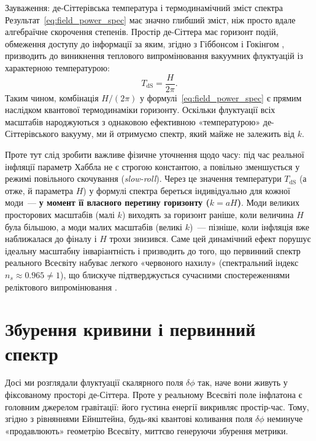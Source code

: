 \begin{keybox}{Зауваження: де-Сіттерівська температура і термодинамічний зміст спектра}
Результат~\eqref{eq:field_power_spec} має значно глибший зміст, ніж просто вдале
алгебраїчне скорочення степенів. Простір де-Сіттера має горизонт подій, обмеження доступу
до інформації за яким, згідно з Гіббонсом і Гокінгом \cite{gibbons_hawking_1977},
призводить до виникнення теплового випромінювання вакуумних флуктуацій із характерною
температурою:
\begin{equation*}
  T_\mathrm{dS} = \frac{H}{2\pi}.
\end{equation*}
Таким чином, комбінація $H/(2\pi)$ у формулі~\eqref{eq:field_power_spec} є прямим
наслідком квантової термодинаміки горизонту. Оскільки флуктуації всіх масштабів
народжуються з однаковою ефективною «температурою» де-Сіттерівського вакууму,
ми й отримуємо спектр, який майже не залежить від $k$.
\end{keybox}

Проте тут слід зробити важливе фізичне уточнення щодо часу: під час реальної інфляції
параметр Хаббла не є строгою константою, а повільно зменшується у режимі повільного
скочування (\emph{slow-roll}). Через це значення температури $T_\mathrm{dS}$ (а отже,
й параметра $H$) у формулі спектра береться індивідуально для кожної моди~--- \textbf{у момент
її власного перетину горизонту ($k = aH$)}. Моди великих просторових масштабів (малі $k$)
виходять за горизонт раніше, коли величина $H$ була більшою, а моди малих масштабів
(великі $k$)~--- пізніше, коли інфляція вже наближалася до фіналу і $H$ трохи знизився.
Саме цей динамічний ефект порушує ідеальну масштабну інваріантність і призводить до того,
що первинний спектр реального Всесвіту набуває легкого «червоного нахилу» (спектральний
індекс $n_s \approx 0.965 \neq 1$), що блискуче підтверджується сучасними спостереженнями
реліктового випромінювання \cite{planck_2018}.

\section{Збурення кривини і первинний спектр}

Досі ми розглядали флуктуації скалярного поля $\delta\phi$ так, наче вони живуть
у фіксованому просторі де-Сіттера. Проте у реальному Всесвіті поле інфлатона є
головним джерелом гравітації: його густина енергії викривляє простір-час. Тому,
згідно з рівняннями Ейнштейна, будь-які квантові коливання поля $\delta\phi$ неминуче
«продавлюють» геометрію Всесвіту, миттєво генеруючи збурення метрики.

